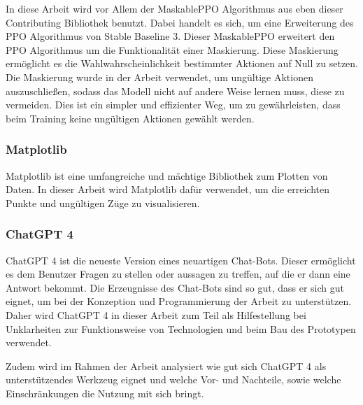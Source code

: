 In diese Arbeit wird vor Allem der MaskablePPO Algorithmus aus eben dieser Contributing Bibliothek benutzt. Dabei handelt es sich, um eine Erweiterung des PPO Algorithmus von Stable Baseline 3. Dieser MaskablePPO erweitert den PPO Algorithmus um die Funktionalität einer Maskierung. Diese Maskierung ermöglicht es die Wahlwahrscheinlichkeit bestimmter Aktionen auf Null zu setzen. Die Maskierung wurde in der Arbeit verwendet, um ungültige Aktionen auszuschließen, sodass das Modell nicht auf andere Weise lernen muss, diese zu vermeiden. Dies ist ein simpler und effizienter Weg, um zu gewährleisten, dass beim Training keine ungültigen Aktionen gewählt werden.
\subsubsection{Matplotlib}
Matplotlib ist eine umfangreiche und mächtige Bibliothek zum Plotten von Daten. In dieser Arbeit wird Matplotlib dafür verwendet, um die erreichten Punkte und ungültigen Züge zu visualisieren.
\subsubsection{ChatGPT 4}
ChatGPT 4 ist die neueste Version eines neuartigen Chat-Bots. Dieser ermöglicht es dem Benutzer Fragen zu stellen oder aussagen zu treffen, auf die er dann eine Antwort bekommt. Die Erzeugnisse des Chat-Bots sind so gut, dass er sich gut eignet, um bei der Konzeption und Programmierung der Arbeit zu unterstützen. Daher wird ChatGPT 4 in dieser Arbeit zum Teil als Hilfestellung bei Unklarheiten zur Funktionsweise von Technologien und beim Bau des Prototypen verwendet. 

Zudem wird im Rahmen der Arbeit analysiert wie gut sich ChatGPT 4 als unterstützendes Werkzeug eignet und welche Vor- und Nachteile, sowie welche Einschränkungen die Nutzung mit sich bringt.